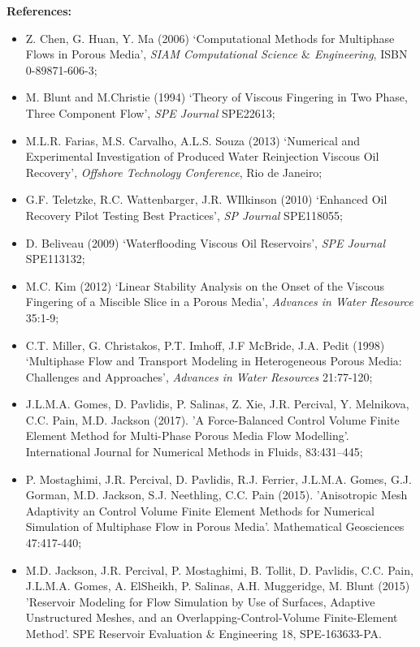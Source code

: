 \documentclass[12pts,a4paper,amsmath,amssymb,floatfix]{article}%
\begin{document}
\begin{enumerate}[label=\bfseries Project: \arabic*:]
\noindent
{\bf References:}
\begin{itemize}
\item Z. Chen, G. Huan, Y. Ma (2006) `Computational Methods for Multiphase Flows in Porous Media', {\it SIAM Computational Science $\&$ Engineering}, ISBN 0-89871-606-3;
\item M. Blunt and M.Christie (1994) `Theory of Viscous Fingering in Two Phase, Three Component Flow', {\it SPE Journal} SPE22613;
\item M.L.R. Farias, M.S. Carvalho, A.L.S. Souza (2013) `Numerical and Experimental Investigation of Produced Water Reinjection Viscous Oil Recovery', {\it Offshore Technology Conference}, Rio de Janeiro;
\item G.F. Teletzke, R.C. Wattenbarger, J.R. WIlkinson (2010) `Enhanced Oil Recovery Pilot Testing Best Practices', {\it SP Journal} SPE118055;
\item D. Beliveau (2009) `Waterflooding Viscous Oil Reservoirs', {\it SPE Journal} SPE113132;
\item M.C. Kim (2012) `Linear Stability Analysis on the Onset of the Viscous Fingering of a Miscible Slice in a Porous Media', {\it Advances in Water Resource} 35:1-9;%
\item C.T. Miller, G. Christakos, P.T. Imhoff, J.F McBride, J.A. Pedit (1998) `Multiphase Flow and Transport Modeling in Heterogeneous Porous Media: Challenges and Approaches', {\it Advances in Water Resources} 21:77-120;
\item J.L.M.A. Gomes, D. Pavlidis, P. Salinas, Z. Xie, J.R. Percival, Y. Melnikova, C.C. Pain, M.D. Jackson (2017). 'A Force-Balanced Control Volume Finite Element Method for Multi-Phase Porous Media Flow Modelling'. International Journal for Numerical Methods in Fluids, 83:431–445;
\item P. Mostaghimi, J.R. Percival, D. Pavlidis, R.J. Ferrier, J.L.M.A. Gomes, G.J.  Gorman, M.D. Jackson, S.J. Neethling, C.C. Pain (2015). 'Anisotropic Mesh Adaptivity an Control Volume Finite Element Methods for Numerical Simulation of Multiphase Flow in Porous Media'. Mathematical Geosciences 47:417-440;
\item M.D. Jackson, J.R. Percival, P. Mostaghimi, B. Tollit, D. Pavlidis, C.C. Pain, J.L.M.A. Gomes, A. ElSheikh, P. Salinas, A.H. Muggeridge, M. Blunt (2015) 'Reservoir Modeling for Flow Simulation by Use of Surfaces, Adaptive Unstructured Meshes, and an Overlapping-Control-Volume Finite-Element Method'. SPE Reservoir Evaluation $\&$ Engineering 18, SPE-163633-PA. 
\end{itemize}





\end{enumerate}
\end{document}
